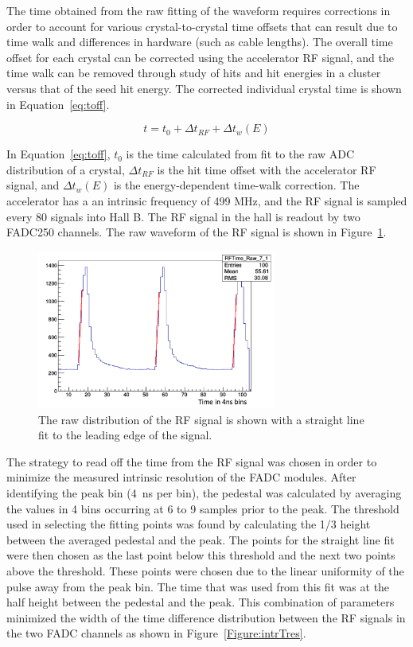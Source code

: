 The time obtained from the raw fitting of the waveform requires corrections in order to account for various crystal-to-crystal time offsets that can result due to time walk and differences in hardware (such as cable lengths). The overall time offset for each crystal can be corrected using the accelerator RF signal, and the time walk can be removed through study of hits and hit energies in a cluster versus that of the seed hit energy. The corrected individual crystal time is shown in Equation~\eqref{eq:toff}.

\begin{equation}
	\label{eq:toff}
	t = t_0 +\Delta t_{RF} + \Delta t_w (E)
\end{equation}

In Equation~\eqref{eq:toff}, $t_0$ is the time calculated from fit to the raw ADC distribution of a crystal, $\Delta t_{RF}$ is the hit time offset with the accelerator RF signal, and $\Delta t_w(E)$ is the energy-dependent time-walk correction. The accelerator has a an intrinsic frequency of 499 MHz, and the RF signal is sampled every 80 signals into Hall B. The RF signal in the hall is readout by two FADC250 channels. The raw waveform of the RF signal is shown in Figure~\ref{Figure:rfFits}. 

\begin{figure}[H]
  \centering
      \includegraphics[width=0.7\textwidth]{pics/performance/rfFits.png}
  \caption[Fitted, raw waveform of the RF signal in HPS]{The raw distribution of the RF signal is shown with a straight line fit to the leading edge of the signal.}
  \label{Figure:rfFits}
\end{figure}

The strategy to read off the time from the RF signal was chosen in order to minimize the measured intrinsic resolution of the FADC modules. After identifying the peak bin (4~ns per bin), the pedestal was calculated by averaging the values in 4 bins occurring at 6 to 9 samples prior to the peak. The threshold used in selecting the fitting points was found by calculating the 1/3 height between the averaged pedestal and the peak. The points for the straight line fit were then chosen as the last point below this threshold and the next two points above the threshold. These points were chosen due to the linear uniformity of the pulse away from the
peak bin. The time that was used from this fit was at the half height between the pedestal and the peak. This combination of parameters minimized the width of the time difference distribution between the RF signals in the two FADC channels as shown in Figure~\ref{Figure:intrTres}. 

